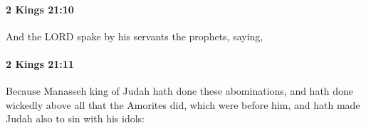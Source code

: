 		\paragraph{2 Kings 21:10} %
			\label{2KINGS-21-10}

			And the LORD spake by his servants the prophets, saying,


		\paragraph{2 Kings 21:11} %
			\label{2KINGS-21-11}

			Because Manasseh king of Judah hath done these abominations, and hath done wickedly above all that the Amorites did, which were before him, and hath made Judah also to sin with his idols:


